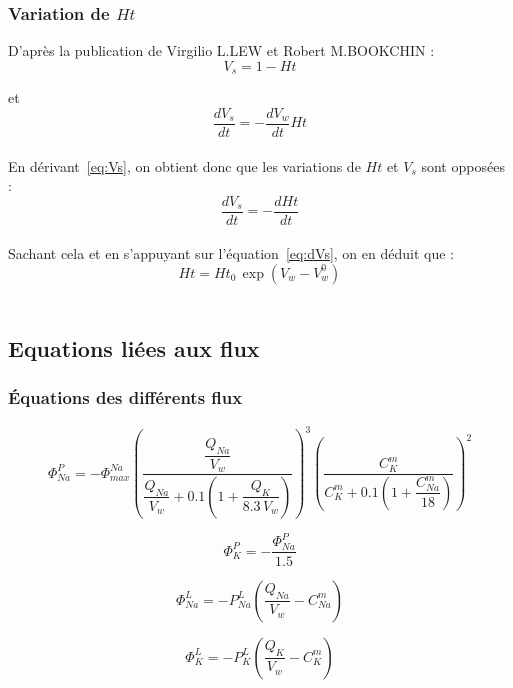 \documentclass[a4paper,fleqn]{article}
\begin{document}
\subsubsection*{Variation de $Ht$}
D'après la publication de Virgilio L.LEW et Robert M.BOOKCHIN : 
\begin{equation}
V_s = 1-Ht \label{eq:Vs}
\end{equation}

et
\begin{equation}
\dfrac{dV_s}{dt} = -\dfrac{dV_w}{dt}Ht \label{eq:dVs}
\end{equation}\\

En dérivant~\eqref{eq:Vs}, on obtient donc que les variations de $Ht$ et $V_s$ sont opposées :
\begin{equation}
\dfrac{dV_s}{dt} = -\dfrac{dHt}{dt}
\end{equation} \\

Sachant cela et en s'appuyant sur l'équation~\eqref{eq:dVs}, on en déduit que :
\begin{equation}
Ht = Ht_0\,\exp{(V_w-V_w^0)} \label{eq:Ht} 
\end{equation}\\

\subsection{Equations liées aux flux}
\subsubsection*{Équations des différents flux}

\begin{equation}
\Phi_{Na}^{P}=-\Phi_{max}^{Na}\left(\frac{\dfrac{Q_{Na}}{V_w}}{\dfrac{Q_{Na}}{V_w} + 0.1\left(1+\dfrac{Q_{K}}{8.3\,V_w}\right)}\right)^3\left(\dfrac{C_{K}^{m}}{C_{K}^{m}+0.1\left(1+\dfrac{C_{Na}^{m}}{18}\right)}\right)^2
\end{equation}

\begin{equation}
\Phi_{K}^{P}=-\frac{\Phi_{Na}^{P}}{1.5}
\end{equation}

\begin{equation}
\Phi_{Na}^{L}=-P_{Na}^{L}\left(\frac{Q_{Na}}{V_w}-C_{Na}^{m}\right)
\end{equation}

\begin{equation}
\Phi_{K}^{L}=-P_{K}^{L}\left(\frac{Q_{K}}{V_w}-C_{K}^{m}\right)
\end{equation}
\end{document}
